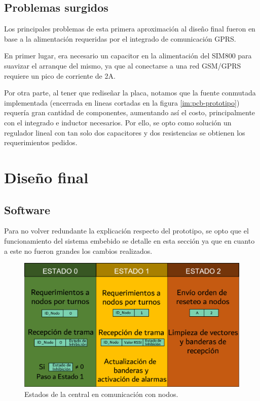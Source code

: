 \subsection{Problemas surgidos}
\par Los principales problemas de esta primera aproximación al diseño final fueron en
base a la alimentación requeridas por el integrado de comunicación GPRS.
\par En primer lugar, era necesario un capacitor en la alimentación del SIM800 para
suavizar el arranque del mismo, ya que al conectarse a una red GSM/GPRS requiere un pico
de corriente de 2A.
\par Por otra parte, al tener que rediseñar la placa, notamos que la fuente conmutada implementada (encerrada en lineas cortadas en la figura \ref{im:pcb-prototipo}) requería gran cantidad de componentes, aumentando así el costo, principalmente con el integrado e inductor necesarios. Por ello, se opto como solución un regulador lineal con tan solo dos capacitores y dos resistencias se obtienen los requerimientos pedidos. 

\section{Diseño final}
\subsection{Software}
\par Para no volver redundante la explicación respecto del prototipo, se opto que el
funcionamiento del sistema embebido se detalle en esta sección ya que en cuanto a este no
fueron grandes los cambios realizados. 

\begin{figure}[h!]
	\centering
	\includegraphics[scale=.53]{images/central/maquina-estado-central.png}
    \caption{Estados de la central en comunicación con nodos.}
	\label{im:maq-est-central}
\end{figure}


